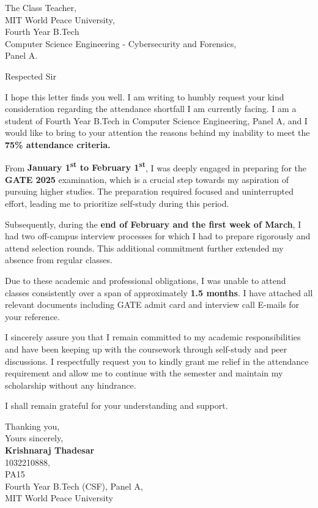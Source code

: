\documentclass[12pt]{letter}
\begin{document}
\begin{letter}{
The Class Teacher,\\
MIT World Peace University,\\
Fourth Year B.Tech \\ Computer Science Engineering - Cybersecurity and Forensics,\\
Panel A.}

\opening{Respected Sir}

I hope this letter finds you well. I am writing to humbly request your kind consideration regarding the attendance shortfall I am currently facing. I am a student of Fourth Year B.Tech in Computer Science Engineering, Panel A, and I would like to bring to your attention the reasons behind my inability to meet the \textbf{75\% attendance criteria.}

From \textbf{January 1\textsuperscript{st} to February 1\textsuperscript{st}}, I was deeply engaged in preparing for the \textbf{GATE 2025} examination, which is a crucial step towards my aspiration of pursuing higher studies. The preparation required focused and uninterrupted effort, leading me to prioritize self-study during this period.

Subsequently, during the \textbf{end of February and the first week of March}, I had two off-campus interview processes for which I had to prepare rigorously and attend selection rounds. This additional commitment further extended my absence from regular classes.

Due to these academic and professional obligations, I was unable to attend classes consistently over a span of approximately \textbf{1.5 months}. I have attached all relevant documents including GATE admit card and interview call E-mails for your reference.

I sincerely assure you that I remain committed to my academic responsibilities and have been keeping up with the coursework through self-study and peer discussions. I respectfully request you to kindly grant me relief in the attendance requirement and allow me to continue with the semester and maintain my scholarship without any hindrance.

I shall remain grateful for your understanding and support.

\closing{Thanking you,\\
Yours sincerely,\\[1em]
\textbf{Krishnaraj Thadesar}\\
1032210888, \\
PA15 \\
Fourth Year B.Tech (CSF), Panel A, \\
MIT World Peace University}

\end{letter}
\end{document}
